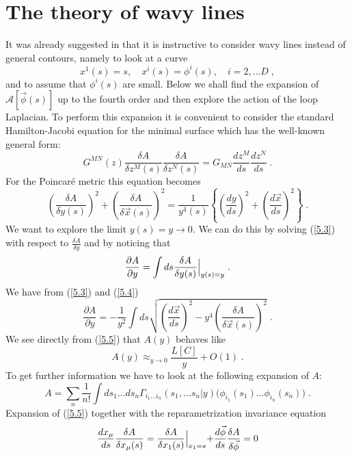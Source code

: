 \documentclass[a4paper,12pt]{article}
\numberwithin{equation}{section}
\begin{document}
\section{The theory of wavy lines}

It was already suggested in \cite{1} that it is instructive to consider wavy
lines instead of general contours, namely to look at a curve
\[
x^{1}(s)=s,\quad x^{i}(s)=\phi ^{i}(s),\quad i=2,\ldots D\; ,\]
 and to assume that \( \phi ^{i}(s) \) are small. Below we shall find the expansion
of \( \mathcal{A}[\vec{\phi }(s)] \) up to the fourth order and then explore
the action of the loop Laplacian. To perform this expansion it is convenient
to consider the standard Hamilton-Jacobi equation for the minimal surface which
has the well-known general form:
\[
G^{MN}(z)\frac{\delta A}{\delta z^{M}(s)}\frac{\delta A}{\delta z^{N}(s)}=G_{MN}\frac{dz^{M}}{ds}\frac{dz^{N}}{ds}\; .\]
 For the Poincar\'e metric this equation becomes
\begin{equation}
\label{5.3}
\left( \frac{\delta A}{\delta y(s)}\right) ^{2}+\left( \frac{\delta A}{\delta \vec{x}(s)}\right) ^{2}=\frac{1}{y^{4}(s)}\left\{ \left( \frac{dy}{ds}\right) ^{2}+\left( \frac{d\vec{x}}{ds}\right) ^{2}\right\} \; .
\end{equation}
 We want to explore the limit \( y(s)=y\to 0. \) We can do this by solving
(\ref{5.3}) with respect to \( \frac{\delta A}{\delta y} \) and by noticing
that
\begin{equation}
\label{5.4}
\frac{\partial A}{\partial y}=\int ds\frac{\delta A}{\delta y(s)}\Bigl |_{y(s)=y}\; .
\end{equation}
 We have from (\ref{5.3}) and (\ref{5.4})
\begin{equation}
\label{5.5}
\frac{\partial A}{\partial y}=-\frac{1}{y^{2}}\int ds\sqrt{{\left( \frac{d\vec{x}}{ds}\right) ^{2}-y^{4}\left( \frac{\delta A}{\delta \vec{x}(s)}\right) ^{2}}}\; .
\end{equation}
 We see directly from (\ref{5.5}) that \( A(y) \) behaves like
\[
A(y)\mathop {\approx }_{y\to 0}\frac{L[C]}{y}+O(1)\; .\]
 To get further information we have to look at the following expansion of \( A \):
\[
A=\sum _{n}\frac{1}{n!}\int ds_{1}\ldots ds_{n}\Gamma _{i_{1}\ldots i_{n}}(s_{1},\ldots s_{n}|y)\bigl (\phi _{i_{1}}(s_{1})\ldots \phi _{i_{n}}(s_{n})\bigl )\; .\]
 Expansion of (\ref{5.5}) together with the reparametrization invariance equation
\begin{equation}
\label{5.75}
\frac{dx_{\mu }}{ds}\frac{\delta A}{\delta x_{\mu }(s)}=\frac{\delta A}{\delta x_{1}(s)}\Bigl |_{x_{1}=s}+\frac{d\vec{\phi }}{ds}\frac{\delta A}{\delta \vec{\phi }}=0
\end{equation}
\end{document}
